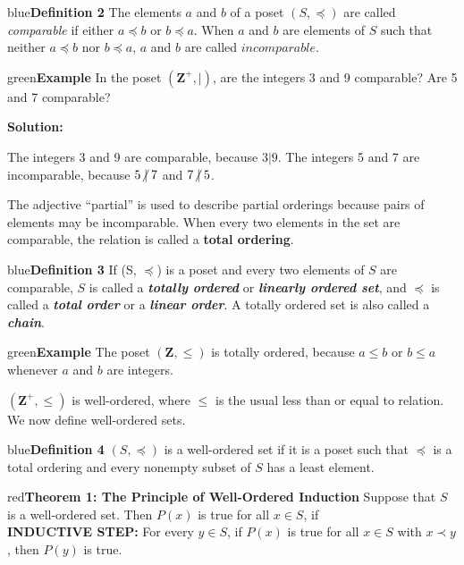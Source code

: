 \documentclass[11pt]{article}
\newenvironment{example}[1][\unskip]{\begin{mybox}{green}{\textbf{Example} {#1}}}{\end{mybox}}
\newenvironment{definition}[1]{\begin{mybox}{blue}{\textbf{Definition #1}}}{\end{mybox}}
\newenvironment{theorem}[1]{\begin{mybox}{red}{\textbf{Theorem #1}}}{\end{mybox}}
\begin{document}
\begin{definition}{2}
The elements $a$ and $b$ of a poset $(S, \preceq)$ are called \textit{comparable} if either $a \preceq b$ or $b \preceq a$. When $a$ and $b$ are elements of $S$ such that neither $a \preceq b$ nor $b \preceq a$, $a$ and $b$ are called $\textit{incomparable}$.
\end{definition}

\begin{example}
In the poset $(\textbf{Z}^+, |)$, are the integers 3 and 9 comparable? Are 5 and 7 comparable?

\textbf{Solution:}

The integers 3 and 9 are comparable, because $3 | 9$. The integers 5 and 7 are incomparable, because $5 \centernot{|} 7$ and $7 \centernot{|} 5$.
\end{example}

The adjective “partial” is used to describe partial orderings because pairs of elements may be incomparable. When every two elements in the set are comparable, the relation is called a \textbf{total ordering}.

\begin{definition}{3}
If (S, $\preceq$) is a poset and every two elements of $S$ are comparable, $S$ is called a \textbf{\textit{totally ordered}} or \textbf{\textit{linearly ordered set}}, and $\preceq$ is called a \textbf{\textit{total order}} or a \textbf{\textit{linear order}}. A totally ordered set is also called a \textbf{\textit{chain}}.
\end{definition}

\begin{example}
The poset $(\textbf{Z}, \leq)$ is totally ordered, because $a \leq b$ or $b \leq a$ whenever $a$ and $b$ are integers.
\end{example}

$(\textbf{Z}^+, \leq)$ is well-ordered, where $\leq$ is the usual less than or equal to relation. We now define well-ordered sets.

\begin{definition}{4}
$(S, \preceq)$ is a well-ordered set if it is a poset such that $\preceq$ is a total ordering and every nonempty subset of $S$ has a least element.
\end{definition}

\begin{theorem}{1: \textbf{The Principle of Well-Ordered Induction}} 
Suppose that $S$ is a well-ordered set. Then $P(x)$ is true for all $x \in S$, if\\

\textbf{INDUCTIVE STEP:} For every $y \in S$, if $P(x)$ is true for all $x \in S$ with $x \prec y$, then $P(y)$ is true.
\end{theorem}
\end{document}
